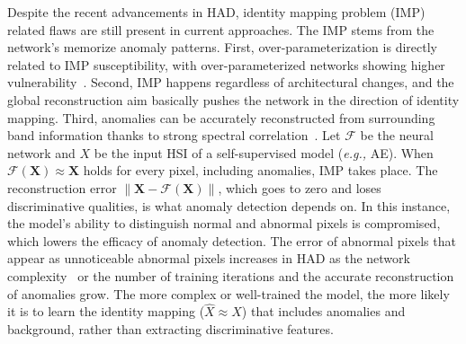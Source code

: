 Despite the recent advancements in HAD, identity mapping problem (IMP) related flaws are still present in current approaches. The IMP stems from the network's memorize anomaly patterns. First, over-parameterization is directly related to IMP susceptibility, with over-parameterized networks showing higher vulnerability~\cite{mou2017deep,luo2022frequency}. Second, IMP happens regardless of architectural changes, and the global reconstruction aim basically pushes the network in the direction of identity mapping. Third, anomalies can be accurately reconstructed from surrounding band information thanks to strong spectral correlation~\cite{li2024superpixel}. Let $\mathcal{F}$ be the neural network and $X$ be the input HSI of a self-supervised model (\textit{e.g.,} AE). When $\mathcal{F}(\mathbf{X}) \approx \mathbf{X}$ holds for every pixel, including anomalies, IMP takes place. The reconstruction error $\|\mathbf{X} - \mathcal{F}(\mathbf{X})\|$, which goes to zero and loses discriminative qualities, is what anomaly detection depends on. In this instance, the model's ability to distinguish normal and abnormal pixels is compromised, which lowers the efficacy of anomaly detection. The error of abnormal pixels that appear as unnoticeable abnormal pixels increases in HAD as the network complexity~\cite{chang2020effective} or the number of training iterations and the accurate reconstruction of anomalies grow. The more complex or well-trained the model, the more likely it is to learn the identity mapping ($\hat{X} \approx X$) that includes anomalies and background, rather than extracting discriminative features. 
